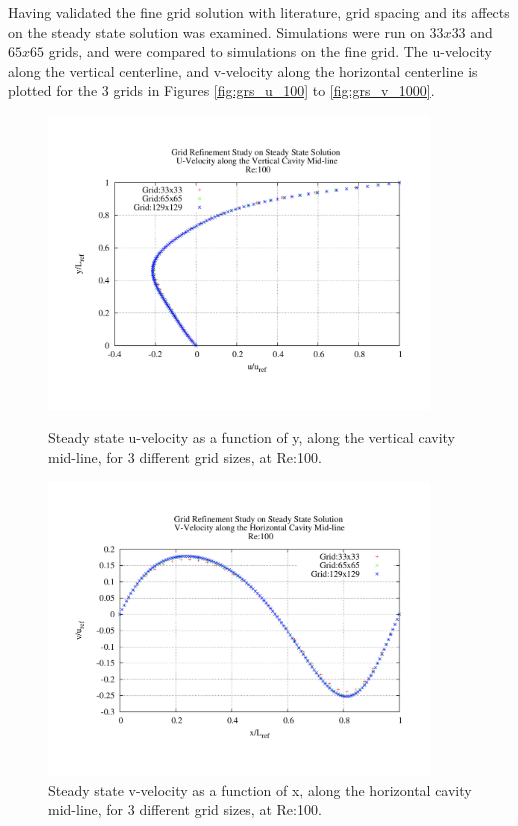 Having validated the fine grid solution with literature, grid spacing and its affects on the steady state solution was examined.  Simulations were run on $33x33$ and $65x65$ grids, and  were compared to simulations on the fine grid.  The u-velocity along the vertical centerline, and v-velocity along the horizontal centerline is plotted for the 3 grids in Figures \ref{fig:grs_u_100} to \ref{fig:grs_v_1000}.

\begin{figure}[h!]
\center
\includegraphics[width=0.9\textwidth]{plots/grs_u_100}
\caption{Steady state u-velocity as a function of y, along the vertical cavity mid-line, for 3 different grid sizes, at Re:100.}
\label{fig:grs_u_100}

\center
\includegraphics[width=0.9\textwidth]{plots/grs_v_100}
\caption{Steady state v-velocity as a function of x, along the horizontal cavity mid-line, for 3 different grid sizes, at Re:100.}
\label{fig:grs_v_100}
\end{figure}

